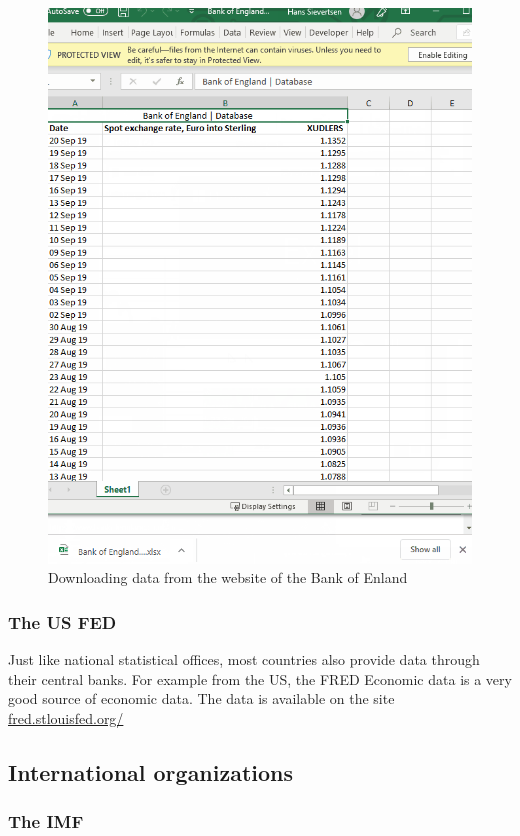\documentclass[]{book}
\begin{document}
\begin{figure}

{\centering \includegraphics[width=0.6\linewidth]{_resources/chapter_sources/bankofengland} 

}

\caption{Downloading data from the website of the Bank of Enland}\label{fig:source4}
\end{figure}

\hypertarget{the-us-fed}{%
\subsubsection{The US FED}\label{the-us-fed}}

Just like national statistical offices, most countries also provide data through their central banks. For example from the US, the FRED Economic data is a very good source of economic data. The data is available on the site \href{https://fred.stlouisfed.org/}{fred.stlouisfed.org/}

\hypertarget{international-organizations}{%
\subsection{International organizations}\label{international-organizations}}

\hypertarget{the-imf}{%
\subsubsection{The IMF}\label{the-imf}}
\end{document}
